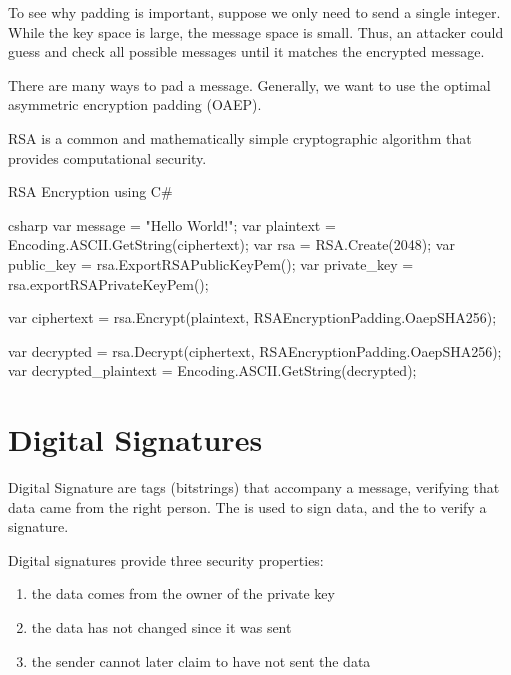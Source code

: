To see why padding is important, suppose we only need to send a single integer. While the key space is large, the message space is small. Thus, an attacker could guess and check all possible messages until it matches the encrypted message.

There are many ways to pad a message. Generally, we want to use the optimal asymmetric encryption padding (OAEP).

\begin{dfnbox}{RSA}{}
     is a common and mathematically simple cryptographic algorithm that provides computational security.
\end{dfnbox}

\begin{codebox}{RSA Encryption using C\#}{}{}
    \begin{amzcode}{csharp}
        var message = "Hello World!";
        var plaintext = Encoding.ASCII.GetString(ciphertext);
        var rsa = RSA.Create(2048);
        var public_key = rsa.ExportRSAPublicKeyPem();
        var private_key = rsa.exportRSAPrivateKeyPem();

        var ciphertext = rsa.Encrypt(plaintext, RSAEncryptionPadding.OaepSHA256);

        var decrypted = rsa.Decrypt(ciphertext, RSAEncryptionPadding.OaepSHA256);
        var decrypted_plaintext = Encoding.ASCII.GetString(decrypted);
    \end{amzcode}
\end{codebox}

\section{Digital Signatures}

\begin{dfnbox}{Digital Signature}{}
     are tags (bitstrings) that accompany a message, verifying that data came from the right person. The  is used to sign data, and the  to verify a signature.
\end{dfnbox}

Digital signatures provide three security properties:
\begin{enumerate}[noitemsep]
    \item {} the data comes from the owner of the private key
    \item {} the data has not changed since it was sent
    \item {} the sender cannot later claim to have not sent the data
\end{enumerate}

